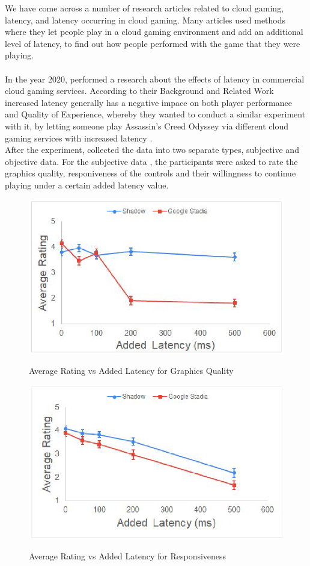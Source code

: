 We have come across a number of research articles related to cloud gaming, latency, and latency occurring in cloud gaming. Many articles used methods where they let people play in a cloud gaming environment and add an additional level of latency, to find out how people performed with the game that they were playing. 
\\\\
In the year 2020, \textcite{desveaux2020effects} performed a research about the effects of latency in commercial cloud gaming services. According to their Background and Related Work \parencite[Chapter 2.3, Page 17]{desveaux2020effects} increased latency generally has a negative impace on both player performance and Quality of Experience, whereby they wanted to conduct a similar experiment with it, by letting someone play Assassin's Creed Odyssey via different cloud gaming services with increased latency \parencite[Chapter 3, Page 18]{desveaux2020effects}.\\
After the experiment, \citeauthor{desveaux2020effects} collected the data into two separate types, subjective and objective data. For the subjective data \parencite[Chapter 4.2.2, Page 36]{desveaux2020effects}, the participants were asked to rate the graphics quality, responiveness of the controls and their willingness to continue playing under a certain added latency value.
\begin{figure}[H]
	\centering
	\includegraphics[width=12cm]{../img/fig13.png}
	\caption{Average Rating vs Added Latency for Graphics Quality}
	\parencite[Chapter 4.2.2, Page 36, Figure 13]{desveaux2020effects}
\end{figure}
\begin{figure}[H]
	\centering
	\includegraphics[width=12cm]{../img/fig14.png}
	\caption{Average Rating vs Added Latency for Responsiveness}
	\parencite[Chapter 4.2.2, Page 37, Figure 14]{desveaux2020effects}
\end{figure}
